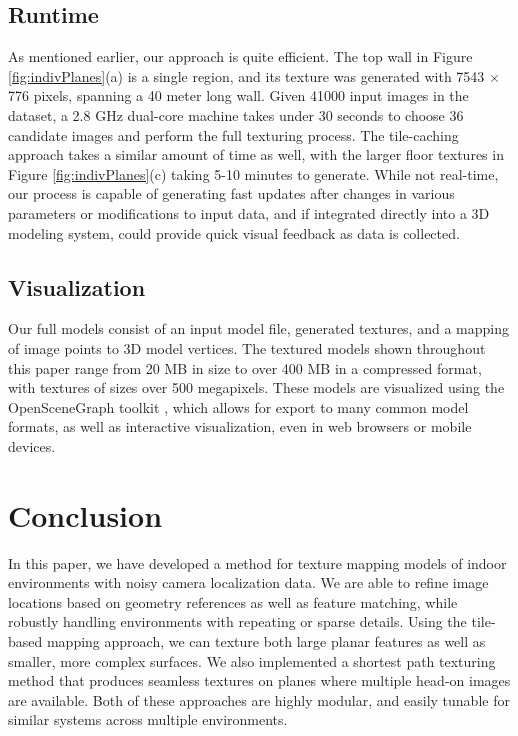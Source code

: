\documentclass[]{spie}  %
\begin{document}
\subsection{Runtime}
As mentioned earlier, our approach is quite efficient. The top wall in
Figure \ref{fig:indivPlanes}(a) is a single region, and its texture
was generated with 7543 $\times$ 776 pixels, spanning a 40 meter long
wall. Given 41000 input images in the dataset, a 2.8 GHz dual-core
machine takes under 30 seconds to choose 36 candidate images and
perform the full texturing process. The tile-caching approach takes a
similar amount of time as well, with the larger floor textures in
Figure \ref{fig:indivPlanes}(c) taking 5-10 minutes to generate.
While not real-time, our process is capable of generating fast updates
after changes in various parameters or modifications to input data,
and if integrated directly into a 3D modeling system, could provide
quick visual feedback as data is collected.


\subsection{Visualization}
Our full models consist of an input model file, generated textures,
and a mapping of image points to 3D model vertices. The textured
models shown throughout this paper range from 20 MB in size to over
400 MB in a compressed format, with textures of sizes over 500
megapixels. These models are visualized using the OpenSceneGraph
toolkit \cite{openscenegraph}, which allows for export to many common
model formats, as well as interactive visualization, even in web
browsers or mobile devices.

\section{Conclusion}
\label{sec:conclusion}

In this paper, we have developed a method for texture mapping models
of indoor environments with noisy camera localization data. We are
able to refine image locations based on geometry references as well as
feature matching, while robustly handling environments with repeating
or sparse details. Using the tile-based mapping approach, we can
texture both large planar features as well as smaller, more complex
surfaces. We also implemented a shortest path texturing method that
produces seamless textures on planes where multiple head-on images are
available. Both of these approaches are highly modular, and easily
tunable for similar systems across multiple environments.
\end{document}

